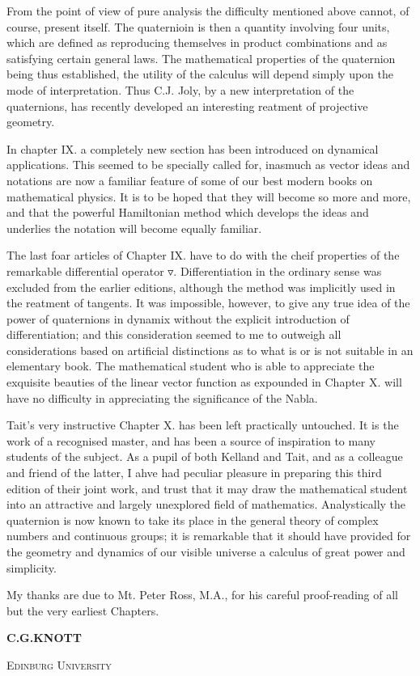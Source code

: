 \documentclass{article}
\begin{document}
From the point of view of pure analysis the difficulty mentioned above cannot, of course, present itself. The quaternioin is then a quantity involving four units, which are defined as reproducing themselves in product combinations and as satisfying certain general laws. The mathematical properties of the quaternion being thus established, the utility of the calculus will depend simply upon the mode of interpretation. Thus C.J. Joly, by a new interpretation of the quaternions, has recently developed an interesting reatment of projective geometry. 

In chapter IX. a completely new section has been introduced on dynamical applications. This seemed to be specially called for, inasmuch as vector ideas and notations are now a familiar feature of some of our best modern books on mathematical physics. It is to be hoped that they will become so more and more, and that the powerful Hamiltonian method which develops the ideas and underlies the notation will become equally familiar.

The last foar articles of Chapter IX. have to do with the cheif properties of the remarkable differential operator $\triangledown$. Differentiation in the ordinary sense was excluded from the earlier editions, although the method was implicitly used in the reatment of tangents. It was impossible, however, to give any true idea of the power of quaternions in dynamix without the explicit introduction of differentiation; and this consideration seemed to me to outweigh all considerations based on artificial distinctions as to what is or is not suitable in an elementary book. The mathematical student who is able to appreciate the exquisite beauties of the linear vector function as expounded in Chapter X. will have no difficulty in appreciating the significance of the Nabla.

Tait's very instructive Chapter X. has been left practically untouched. It is the work of a recognised master, and has been a source of inspiration to many students of the subject. As a pupil of both Kelland and Tait, and as a colleague and friend of the latter, I ahve had peculiar pleasure in preparing this third edition of their joint work, and trust that it may draw the mathematical student into an attractive and largely unexplored field of mathematics. Analystically  the quaternion is now known to take its place in the general theory of complex numbers and continuous groups; it is remarkable that it should have provided for the geometry and dynamics of our visible universe a calculus of great power and simplicity.

My thanks are due to Mt. Peter Ross, M.A., for his careful proof-reading of all but the very earliest Chapters.

\medskip
\hspace{\fill} {\large\textbf{C.G.KNOTT}}\hspace{0.2in}
\medskip

\textsc{Edinburg University}

\end{document}
